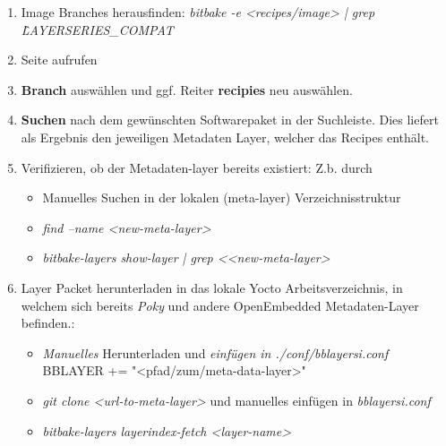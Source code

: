 \begin{enumerate}
    \item Image Branches herausfinden:
        \textit{bitbake -e <recipes/image> | grep \newline \^LAYERSERIES\_COMPAT}

    \item Seite \cite{OpenEmbedded:Indexer_Recipes} aufrufen

    \item \textbf{Branch} auswählen und ggf. Reiter \textbf{recipies} neu
        auswählen.

    \item \textbf{Suchen} nach dem gewünschten Software\-paket in der Suchleiste.
        Dies liefert als Ergebnis den jeweiligen Metadaten Layer, welcher das
        Recipes enthält.

    \item Verifizieren, ob der Metadaten-layer bereits existiert: Z.b. durch
        \begin{itemize}
            \item Manuelles Suchen in der lokalen (meta-layer) Verzeichnisstruktur
            \item \textit{find --name <new-meta-layer>}
            \item \textit{bitbake-layers show-layer | grep <<new-meta-layer>}
        \end{itemize}

    \item Layer Packet herunterladen in das lokale Yocto Arbeitsverzeichnis, in
        welchem sich bereits \textit{Poky} und andere OpenEmbedded
        Metadaten-Layer befinden.:
        \begin{itemize}
            \item \textit{Manuelles} Herunterladen und
                \textit{einfügen in ./conf/bblayersi.conf}
                BBLAYER += "<pfad/zum/meta-data-layer>"
            \item \textit{git clone <url-to-meta-layer>} und manuelles einfügen
                                        in \textit{bblayersi.conf}
            \item \textit{bitbake-layers layerindex-fetch <layer-name>}
        \end{itemize}


\end{enumerate}
